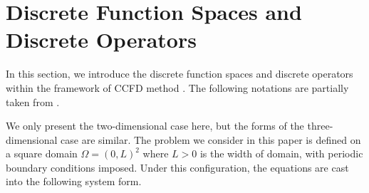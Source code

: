 \section{Discrete Function Spaces and Discrete Operators}
\label{section:discrete}
In this section, we introduce the discrete function spaces and discrete operators within the framework of CCFD method \cite{tryggvason2011direct}. 
The following notations are partially taken from \cite{chen2019positivity,li2025overcoming}.
\par We only present the two-dimensional case here, but the forms of the three-dimensional case are similar. 
The problem we consider in this paper is defined on a square domain $\Omega=(0,L)^2$ where $L>0$ is the width of domain, 
with periodic boundary conditions imposed. Under this configuration, the equations are cast into the following system form.

